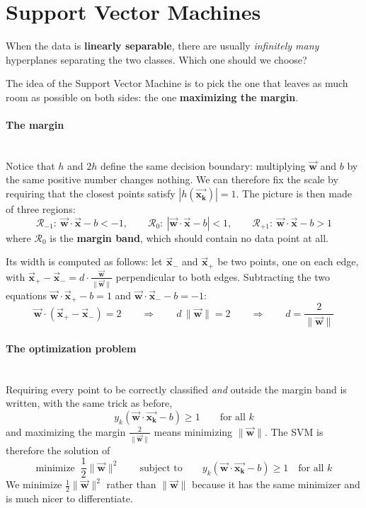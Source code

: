 \documentclass[]{article}
\newcommand{\vecx}{ \vec{\mathbf{x}} }
\newcommand{\vecxk}{ \vec{\mathbf{x_k}} }
\newcommand{\vecw}{ \vec{\mathbf{w}} }
\begin{document}
	\section{Support Vector Machines}

	When the data is \textbf{linearly separable}, there are usually \textit{infinitely many} hyperplanes separating the two classes.
	Which one should we choose?

	The idea of the Support Vector Machine is to pick the one that leaves as much room as possible on both sides: the one \textbf{maximizing the margin}.

	\paragraph{The margin}
	\noindent\\
	Notice that $h$ and $2h$ define the same decision boundary: multiplying $\vecw$ and $b$ by the same positive number changes nothing.
	We can therefore fix the scale by requiring that the closest points satisfy $|h(\vecxk)| = 1$.
	The picture is then made of three regions:
	$$
	\mathcal{R}_{-1}: \ \vecw \cdot \vecx - b < -1,
	\qquad
	\mathcal{R}_{0}: \ \left| \vecw \cdot \vecx - b \right| < 1,
	\qquad
	\mathcal{R}_{+1}: \ \vecw \cdot \vecx - b > 1
	$$
	where $\mathcal{R}_0$ is the \textbf{margin band}, which should contain no data point at all.

	Its width is computed as follows: let $\vecx_-$ and $\vecx_+$ be two points, one on each edge, with $\vecx_+ - \vecx_- = d \cdot \frac{\vecw}{\|\vecw\|}$ perpendicular to both edges.
	Subtracting the two equations $\vecw \cdot \vecx_+ - b = 1$ and $\vecw \cdot \vecx_- - b = -1$:
	$$
	\vecw \cdot \left( \vecx_+ - \vecx_- \right) = 2
	\qquad \Longrightarrow \qquad
	d \, \|\vecw\| = 2
	\qquad \Longrightarrow \qquad
	d = \frac{2}{\|\vecw\|}
	$$

	\paragraph{The optimization problem}
	\noindent\\
	Requiring every point to be correctly classified \textit{and} outside the margin band is written, with the same trick as before,
	$$
	y_k \left( \vecw \cdot \vecxk - b \right) \geq 1
	\qquad \text{for all } k
	$$
	and maximizing the margin $\frac{2}{\|\vecw\|}$ means minimizing $\|\vecw\|$.
	The SVM is therefore the solution of
	$$
	\text{minimize } \ \frac{1}{2}\|\vecw\|^2
	\qquad \text{subject to} \qquad
	y_k \left( \vecw \cdot \vecxk - b \right) \geq 1 \quad \text{for all } k
	$$
	We minimize $\frac{1}{2}\|\vecw\|^2$ rather than $\|\vecw\|$ because it has the same minimizer and is much nicer to differentiate.
\end{document}
